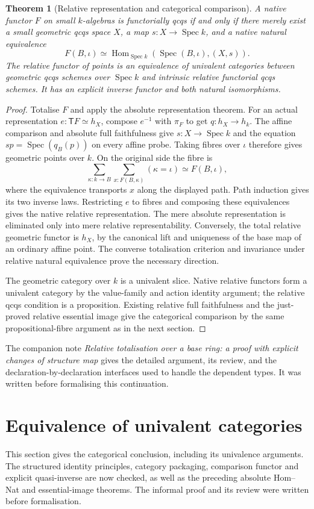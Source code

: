 \documentclass[11pt]{amsart}
\newtheorem{theorem}{Theorem}[section]
\theoremstyle{definition}\newtheorem{definition}[theorem]{Definition}
\theoremstyle{remark}\newtheorem{remark}[theorem]{Remark}
\newcommand{\Hom}{\operatorname{Hom}}
\newcommand{\Spec}{\operatorname{Spec}}
\begin{document}
\begin{theorem}[Relative representation and categorical comparison]
A native functor $F$ on small $k$-algebras is functorially qcqs if and
only if there merely exist a small geometric qcqs space $X$, a map
$s:X\to\Spec k$, and a native natural equivalence
\[
 F(B,\iota)\simeq\Hom_{\Spec k}(\Spec(B,\iota),(X,s)).
\]
The relative functor of points is an equivalence of univalent categories
between geometric qcqs schemes over $\Spec k$ and intrinsic relative
functorial qcqs schemes. It has an explicit inverse functor and both
natural isomorphisms.
\end{theorem}
\begin{proof}
Totalise $F$ and apply the absolute representation theorem. For an actual
representation $e:\mathsf T F\simeq h_X$, compose $e^{-1}$ with $\pi_F$
to get $q:h_X\to h_k$. The affine comparison and absolute full
faithfulness give $s:X\to\Spec k$ and the equation
$s p=\Spec(q_B(p))$ on every affine probe. Taking fibres over $\iota$
therefore gives geometric points over $k$. On the original side the
fibre is
\[
 \sum_{\kappa:k\to B}\sum_{x:F(B,\kappa)}(\kappa=\iota)
       \simeq F(B,\iota),
\]
where the equivalence transports $x$ along the displayed path. Path
induction gives its two inverse laws. Restricting $e$ to fibres and
composing these equivalences gives the native relative representation.
The mere absolute representation is eliminated only into mere relative
representability. Conversely, the total relative geometric functor is
$h_X$, by the canonical lift and uniqueness of the base map of an
ordinary affine point. The converse totalisation criterion and invariance
under relative natural equivalence prove the necessary direction.

The geometric category over $k$ is a univalent slice. Native relative
functors form a univalent category by the value-family and action
identity argument; the relative qcqs condition is a proposition.
Existing relative full faithfulness and the just-proved relative
essential image give the categorical comparison by the same
propositional-fibre argument as in the next section.
\end{proof}

The companion note \emph{Relative totalisation over a base ring: a proof
with explicit changes of structure map} gives the detailed argument,
its review, and the declaration-by-declaration interfaces used to handle
the dependent types. It was written before formalising this continuation.

\section{Equivalence of univalent categories}
This section gives the categorical conclusion, including its univalence
arguments. The structured identity principles, category packaging,
comparison functor and explicit quasi-inverse are now checked, as well
as the preceding absolute Hom--Nat and essential-image theorems.
The informal proof and its review were written before formalisation.
\end{document}
